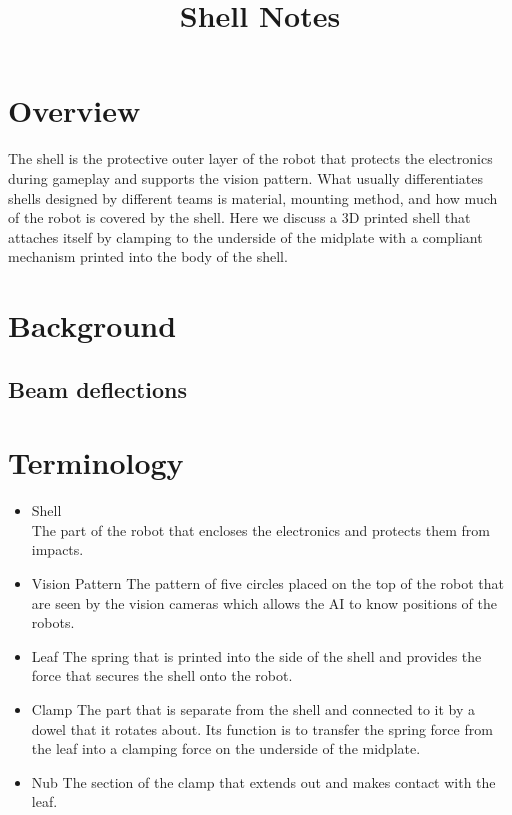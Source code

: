 \documentclass{iopart}
\begin{document}
\title{Shell Notes}


\section{Overview}
The shell is the protective outer layer of the robot that protects the electronics during gameplay and supports the vision pattern. What usually differentiates shells designed by different teams is material, mounting method, and how much of the robot is covered by the shell. Here we discuss a 3D printed shell that attaches itself by clamping to the underside of the midplate with a compliant mechanism printed into the body of the shell.



\section{Background}
\subsection{Beam deflections}

\section{Terminology}
\begin{itemize}
    \item Shell \\
            The part of the robot that encloses the electronics and protects them from impacts.
    \item Vision Pattern
            The pattern of five circles placed on the top of the robot that are seen by the vision cameras which allows the AI to know positions of the robots.
    \item Leaf
            The spring that is printed into the side of the shell and provides the force that secures the shell onto the robot.
    \item Clamp
    The part that is separate from the shell and connected to it by a dowel that it rotates about. Its function is to transfer the spring force from the leaf into a clamping force on the underside of the midplate.
    \item Nub
    The section of the clamp that extends out and makes contact with the leaf.
\end{itemize}
\end{document}
